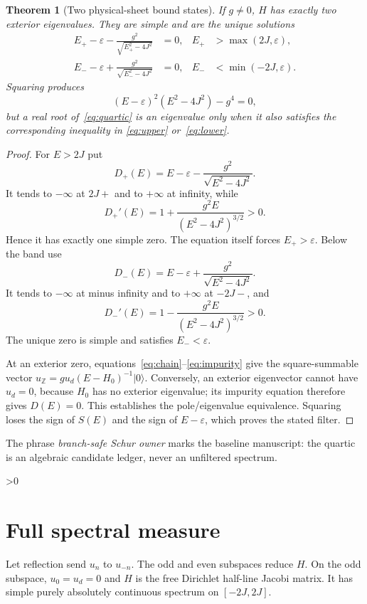\documentclass[9pt]{extarticle}
\providecommand{\CRevisionRound}{2}
\newtheorem{theorem}{Theorem}
\begin{document}
\begin{theorem}[Two physical-sheet bound states]\label{thm:poles}
If $g\ne0$, $H$ has exactly two exterior eigenvalues.  They are simple and
are the unique solutions
\begin{align}
 E_+-\varepsilon-\frac{g^2}{\sqrt{E_+^2-4J^2}}&=0,
 &E_+&>\max(2J,\varepsilon),\label{eq:upper}\\
 E_--\varepsilon+\frac{g^2}{\sqrt{E_-^2-4J^2}}&=0,
 &E_-&<\min(-2J,\varepsilon).\label{eq:lower}
\end{align}
Squaring produces
\begin{equation}\label{eq:quartic}
 (E-\varepsilon)^2(E^2-4J^2)-g^4=0,
\end{equation}
but a real root of~\eqref{eq:quartic} is an eigenvalue only when it also
satisfies the corresponding inequality in
\eqref{eq:upper} or~\eqref{eq:lower}.
\end{theorem}

\begin{proof}
For $E>2J$ put
\[
 D_+(E)=E-\varepsilon-\frac{g^2}{\sqrt{E^2-4J^2}}.
\]
It tends to $-\infty$ at $2J+$ and to $+\infty$ at infinity, while
\[
 D_+'(E)=1+\frac{g^2E}{(E^2-4J^2)^{3/2}}>0.
\]
Hence it has exactly one simple zero.  The equation itself forces
$E_+>\varepsilon$.  Below the band use
\[
 D_-(E)=E-\varepsilon+\frac{g^2}{\sqrt{E^2-4J^2}}.
\]
It tends to $-\infty$ at minus infinity and to $+\infty$ at $-2J-$, and
\[
 D_-'(E)=1-\frac{g^2E}{(E^2-4J^2)^{3/2}}>0.
\]
The unique zero is simple and satisfies $E_-<\varepsilon$.

At an exterior zero, equations~\eqref{eq:chain}--\eqref{eq:impurity}
give the square-summable vector
$u_{\mathbb Z}=g u_d(E-H_0)^{-1}|0\rangle$.  Conversely, an exterior
eigenvector cannot have $u_d=0$, because $H_0$ has no exterior eigenvalue;
its impurity equation therefore gives $D(E)=0$.  This establishes the
pole/eigenvalue equivalence.  Squaring loses the sign of $S(E)$ and the sign
of $E-\varepsilon$, which proves the stated filter.
\end{proof}

The phrase \emph{branch-safe Schur owner} marks the baseline manuscript:
the quartic is an algebraic candidate ledger, never an unfiltered spectrum.

\ifnum\CRevisionRound>0
\section{Full spectral measure}
Let reflection send $u_n$ to $u_{-n}$.  The odd and even subspaces reduce
$H$.  On the odd subspace, $u_0=u_d=0$ and $H$ is the free Dirichlet
half-line Jacobi matrix.  It has simple purely absolutely continuous spectrum
on $[-2J,2J]$.
\end{document}
